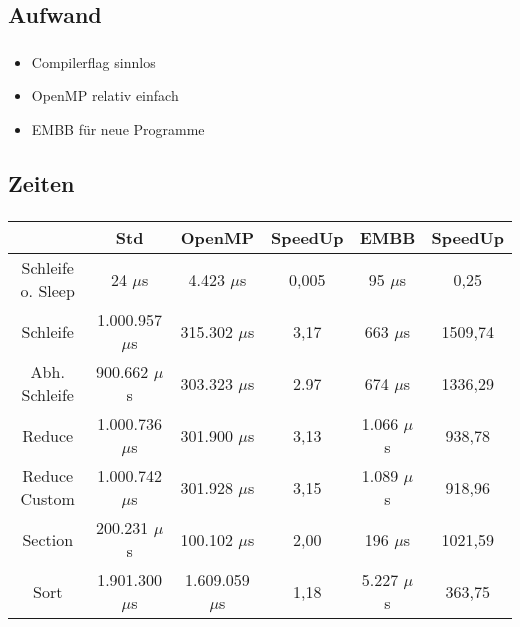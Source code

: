 \subsection{Aufwand}
\begin{frame}
	\frametitle{\secname}
	\framesubtitle{\subsecname}
	
	\begin{itemize}
		\item Compilerflag sinnlos
		\item OpenMP relativ einfach
		\item EMBB für neue Programme
	\end{itemize}
\end{frame}

\subsection{Zeiten}
\begin{frame}
	\frametitle{\secname}
	\framesubtitle{\subsecname}
	
	\begin{scriptsize}
	\begin{tabular}{|c|c|cc|cc|}
	\hline 
	 & \textbf{Std} & \textbf{OpenMP} & \textbf{SpeedUp} & \textbf{EMBB} & \textbf{SpeedUp} \\
	\hline 
	Schleife o. Sleep & 24 $\mu$s & 4.423 $\mu$s & 0,005 & 95 $\mu$s & 0,25 \\ 
	\hline  
	Schleife & 1.000.957 $\mu$s & 315.302 $\mu$s & 3,17 & 663 $\mu$s & 1509,74 \\ 
	\hline 
	Abh. Schleife & 900.662 $\mu$s & 303.323 $\mu$s & 2.97 & 674 $\mu$s & 1336,29 \\ 
	\hline 
	Reduce & 1.000.736 $\mu$s & 301.900 $\mu$s & 3,13 & 1.066 $\mu$s & 938,78 \\ 
	\hline 
	Reduce Custom & 1.000.742 $\mu$s & 301.928 $\mu$s & 3,15 & 1.089 $\mu$s & 918,96 \\ 
	\hline 
	Section & 200.231 $\mu$s & 100.102 $\mu$s & 2,00 & 196 $\mu$s & 1021,59 \\ 
	\hline 
	Sort & 1.901.300 $\mu$s & 1.609.059 $\mu$s & 1,18 & 5.227 $\mu$s & 363,75 \\ 
	\hline 
	\end{tabular}
	\end{scriptsize}
\end{frame}